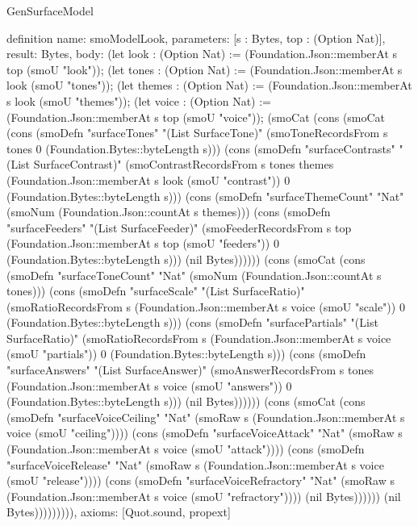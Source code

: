 \begin{lexlean}{GenSurfaceModel}
\begin{semanticmodule}
definition{
  name: smoModelLook,
  parameters: [s : Bytes, top : (Option Nat)],
  result: Bytes,
  body: (let look : (Option Nat) := (Foundation.Json::memberAt s top (smoU "look")); (let tones : (Option Nat) := (Foundation.Json::memberAt s look (smoU "tones")); (let themes : (Option Nat) := (Foundation.Json::memberAt s look (smoU "themes")); (let voice : (Option Nat) := (Foundation.Json::memberAt s top (smoU "voice")); (smoCat (cons (smoCat (cons (smoDefn "surfaceTones" "(List SurfaceTone)" (smoToneRecordsFrom s tones 0 (Foundation.Bytes::byteLength s))) (cons (smoDefn "surfaceContrasts" "(List SurfaceContrast)" (smoContrastRecordsFrom s tones themes (Foundation.Json::memberAt s look (smoU "contrast")) 0 (Foundation.Bytes::byteLength s))) (cons (smoDefn "surfaceThemeCount" "Nat" (smoNum (Foundation.Json::countAt s themes))) (cons (smoDefn "surfaceFeeders" "(List SurfaceFeeder)" (smoFeederRecordsFrom s top (Foundation.Json::memberAt s top (smoU "feeders")) 0 (Foundation.Bytes::byteLength s))) (nil Bytes)))))) (cons (smoCat (cons (smoDefn "surfaceToneCount" "Nat" (smoNum (Foundation.Json::countAt s tones))) (cons (smoDefn "surfaceScale" "(List SurfaceRatio)" (smoRatioRecordsFrom s (Foundation.Json::memberAt s voice (smoU "scale")) 0 (Foundation.Bytes::byteLength s))) (cons (smoDefn "surfacePartials" "(List SurfaceRatio)" (smoRatioRecordsFrom s (Foundation.Json::memberAt s voice (smoU "partials")) 0 (Foundation.Bytes::byteLength s))) (cons (smoDefn "surfaceAnswers" "(List SurfaceAnswer)" (smoAnswerRecordsFrom s tones (Foundation.Json::memberAt s voice (smoU "answers")) 0 (Foundation.Bytes::byteLength s))) (nil Bytes)))))) (cons (smoCat (cons (smoDefn "surfaceVoiceCeiling" "Nat" (smoRaw s (Foundation.Json::memberAt s voice (smoU "ceiling")))) (cons (smoDefn "surfaceVoiceAttack" "Nat" (smoRaw s (Foundation.Json::memberAt s voice (smoU "attack")))) (cons (smoDefn "surfaceVoiceRelease" "Nat" (smoRaw s (Foundation.Json::memberAt s voice (smoU "release")))) (cons (smoDefn "surfaceVoiceRefractory" "Nat" (smoRaw s (Foundation.Json::memberAt s voice (smoU "refractory")))) (nil Bytes)))))) (nil Bytes))))))))),
  axioms: [Quot.sound, propext]
}


\end{semanticmodule}
\end{lexlean}
